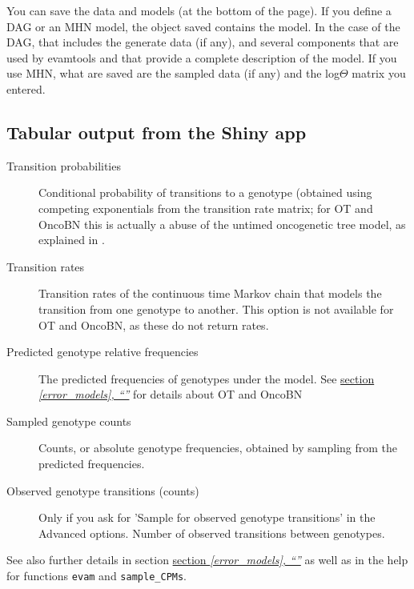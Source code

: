 \documentclass[a4paper,11pt]{article}
\newcommand*{\qrefS}[1]{\hyperref[{#1}]{section \textit{\ref*{#1},
      ``\nameref*{#1}''}}}
\begin{document}
 You can save the data and models (at the bottom of the page). If you define a DAG or an MHN model, the object saved contains the model. In the case of the DAG, that includes the generate data (if any), and several components that are used by evamtools and that provide a complete description of the model. If you use MHN, what are saved are the sampled data (if any) and the log$\Theta$ matrix you entered.

\subsection{Tabular output from the Shiny app}
\label{tabular-output}

\begin{description}
\item[Transition probabilities] Conditional probability of transitions to a genotype (obtained using competing exponentials from the transition rate matrix; for OT and OncoBN this is actually a abuse of the untimed oncogenetic tree model, as explained in \cite{diaz2019every}.
\item[Transition rates] Transition rates of the continuous time Markov chain that models the transition from one genotype to another. This option is not available for OT and OncoBN, as these do not return rates.
\item[Predicted genotype relative frequencies] The predicted frequencies of genotypes under the model. See \qrefS{error_models} for details about OT and OncoBN
\item[Sampled genotype counts] Counts, or absolute genotype frequencies, obtained by sampling from the predicted frequencies.
  
\item[Observed genotype transitions (counts)] Only if you ask for 'Sample for observed genotype transitions' in the Advanced options. Number of observed transitions between genotypes.
  
\end{description}


See also further details in section \qrefS{error_models} as well as in the help for functions \texttt{evam} and \texttt{sample\_CPMs}.


 







\end{document}

